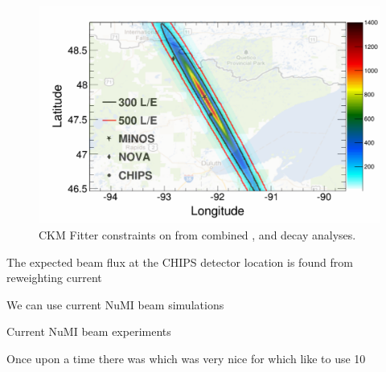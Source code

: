 \begin{figure}
    \includegraphics[width=\largefigwidth]{diagrams/4-chips/numi_map}
    \caption[CKM Fitter constraints on \alphaCKM.]%
    {CKM Fitter constraints on \alphaCKM from combined \BToPiPi,
        \BToRhoPi and \BToRhoRho decay analyses.}
    \label{fig:numi_map}
\end{figure}

The expected beam flux at the CHIPS detector location is found from reweighting current

We can use current NuMI beam simulations

Current NuMI beam experiments


Once upon a time there was \chips which was very nice for \nova which like to use \unit{10}{\GeV}
